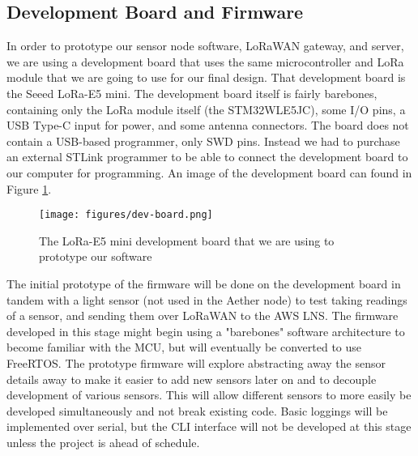 \subsection{Development Board and Firmware}
In order to prototype our sensor node software, LoRaWAN gateway, and server, we are using
a development board that uses the same microcontroller and LoRa module that we are going to use for
our final design. That development board is the Seeed LoRa-E5 mini. The development board itself is
fairly barebones, containing only the LoRa module itself (the STM32WLE5JC), some I/O pins, a USB
Type-C input for power, and some antenna connectors. The board does not contain a USB-based
programmer, only SWD pins. Instead we had to purchase an external STLink programmer to be able to
connect the development board to our computer for programming. An image of the development board can
found in Figure \ref{fig:dev-board}.

\begin{figure}
    \centering
    \texttt{[image: figures/dev-board.png]}
    \caption{The LoRa-E5 mini development board that we are using to prototype our software}
    \label{fig:dev-board}
\end{figure}

The initial prototype of the firmware will be done on the development board in tandem with a light
sensor (not used in the Aether node) to test taking readings of a sensor, and sending them over
LoRaWAN to the AWS LNS. The firmware developed in this stage might begin using a "barebones"
software architecture to become familiar with the MCU, but will eventually be converted to use
FreeRTOS. The prototype firmware will explore abstracting away the sensor details away to make it
easier to add new sensors later on and to decouple development of various sensors. This will allow
different sensors to more easily be developed simultaneously and not break existing code. Basic
loggings will be implemented over serial, but the CLI interface will not be developed at this stage
unless the project is ahead of schedule. 
